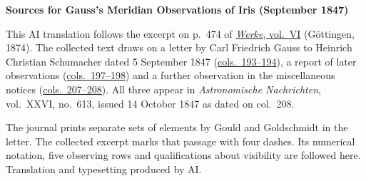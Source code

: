 \clearpage\thispagestyle{empty}
\begin{center}\textbf{Sources for Gauss’s Meridian Observations of Iris (September 1847)}\end{center}
\noindent This AI translation follows the excerpt on p.~474 of \href{https://gdz.sub.uni-goettingen.de/id/PPN236007467}{\textit{Werke}, vol.~VI} (Göttingen, 1874). The collected text draws on a letter by Carl Friedrich Gauss to Heinrich Christian Schumacher dated 5 September 1847 (\href{https://api.digitale-sammlungen.de/iiif/image/v2/bsb10049451_00105/full/1800,/0/default.jpg}{cols.~193--194}), a report of later observations (\href{https://api.digitale-sammlungen.de/iiif/image/v2/bsb10049451_00107/full/1800,/0/default.jpg}{cols.~197--198}) and a further observation in the miscellaneous notices (\href{https://api.digitale-sammlungen.de/iiif/image/v2/bsb10049451_00112/full/1800,/0/default.jpg}{cols.~207--208}). All three appear in \textit{Astronomische Nachrichten}, vol.~XXVI, no.~613, issued 14 October 1847 as dated on col.~208.
\par\smallskip\noindent The journal prints separate sets of elements by Gould and Goldschmidt in the letter. The collected excerpt marks that passage with four dashes. Its numerical notation, five observing rows and qualifications about visibility are followed here. Translation and typesetting produced by AI.
\clearpage
